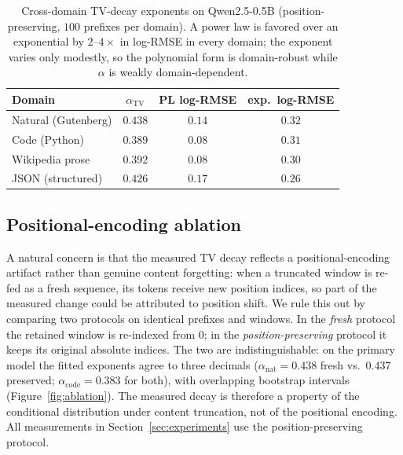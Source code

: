 \documentclass[11pt]{article}
\newcommand{\TV}{\mathrm{TV}}
\theoremstyle{plain}
\theoremstyle{definition}
\theoremstyle{remark}
\begin{document}
\begin{table}[ht]
\centering
\small
\setlength{\tabcolsep}{5pt}
\begin{tabular}{lccc}
\toprule
Domain & $\alpha_{\TV}$ & PL log-RMSE & exp.\ log-RMSE \\
\midrule
Natural (Gutenberg) & $0.438$ & $0.14$ & $0.32$ \\
Code (Python)       & $0.389$ & $0.08$ & $0.31$ \\
Wikipedia prose     & $0.392$ & $0.08$ & $0.30$ \\
JSON (structured)   & $0.426$ & $0.17$ & $0.26$ \\
\bottomrule
\end{tabular}
\caption{Cross-domain TV-decay exponents on Qwen2.5-0.5B
(position-preserving, $100$ prefixes per domain). A power law is
favored over an exponential by $2$--$4\times$ in log-RMSE in every
domain; the exponent varies only modestly, so the polynomial form is
domain-robust while $\alpha$ is weakly domain-dependent.}
\label{tab:crossdomain}
\end{table}

\subsection{Positional-encoding ablation}
\label{app:exp-ablation}
\label{sec:exp-ablation}
A natural concern is that the measured TV decay reflects a
positional-encoding artifact rather than genuine content forgetting:
when a truncated window is re-fed as a fresh sequence, its tokens
receive new position indices, so part of the measured change could
be attributed to position shift. We rule this out by comparing two
protocols on identical prefixes and windows. In the \emph{fresh}
protocol the retained window is re-indexed from $0$; in the
\emph{position-preserving} protocol it keeps its original absolute
indices. The two are indistinguishable: on the primary model the
fitted exponents agree to three decimals
($\alpha_{\text{nat}} = 0.438$ fresh vs.\ $0.437$ preserved;
$\alpha_{\text{code}} = 0.383$ for both), with overlapping bootstrap
intervals (Figure~\ref{fig:ablation}). The measured decay is
therefore a property of the conditional distribution under content
truncation, not of the positional encoding. All measurements in
Section~\ref{sec:experiments} use the position-preserving protocol.
\end{document}
